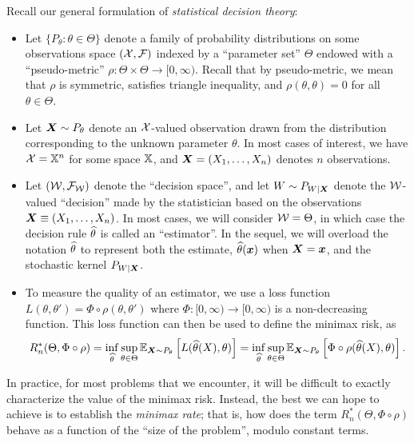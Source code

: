 \documentclass[12pt]{article}
\begin{document}
Recall our general formulation of \emph{statistical decision theory}: 
\begin{itemize}
	\item Let $\{P_\theta: \theta \in \Theta\}$ denote a family of probability distributions on some observations space $({\cal X}, {\cal F})$ indexed by a ``parameter set'' $\Theta$ endowed with a ``pseudo-metric'' $\rho:\Theta \times \Theta \to [0, \infty)$. Recall that by pseudo-metric, we mean that $\rho$ is symmetric, satisfies triangle inequality, and $\rho(\theta, \theta)=0$ for all $\theta \in \Theta$. 

	\item Let ${\boldsymbol X} \sim P_\theta$ denote an ${\cal X}$-valued observation drawn from the distribution corresponding to the unknown parameter $\theta$. In most cases of interest, we have ${\cal X} = \mathbb{X}^n$ for some space $\mathbb{X}$, and ${\boldsymbol X} = (X_1, \ldots, X_n)$ denotes $n$ observations. 

	\item Let $({\cal W}, {\cal F}_{\cal W})$ denote the ``decision space'', and let $W \sim P_{W|{\boldsymbol X}}$  denote the ${\cal W}$-valued ``decision'' made by the statistician based on the observations ${\boldsymbol X} \equiv (X_1, \ldots, X_n)$. In most cases, we will consider ${\cal W} = \Theta$, in which case the decision rule $\widehat{\theta}$ is called an ``estimator''. In the sequel, we will overload the notation $\widehat{\theta}$ to represent both the estimate, $\widehat{\theta}({\boldsymbol x})$ when ${\boldsymbol X}={\boldsymbol x}$, and the stochastic kernel $P_{W|{\boldsymbol X}}$. 

	\item To measure the quality of an estimator, we use a loss function $L(\theta, \theta') = \Phi \circ \rho(\theta, \theta')$ where $\Phi:[0,\infty) \to [0,\infty)$ is a non-decreasing function. This loss function can then be used to define the minimax risk, as 
	\begin{align}
		R_n^*(\Theta, \Phi\circ \rho) =\inf_{\widehat{\theta}} \sup_{\theta \in \Theta} \mathbb{E}_{{\boldsymbol X} \sim P_\theta} \left[ L(\widehat{\theta}(X), \theta) \right] =\inf_{\widehat{\theta}} \sup_{\theta \in \Theta} \mathbb{E}_{{\boldsymbol X} \sim P_\theta} \left[ \Phi \circ \rho(\widehat{\theta}(X), \theta) \right]. 
	\end{align}
\end{itemize}
In practice, for most problems that we encounter, it will be difficult to exactly characterize the value of the minimax risk. Instead, the best we can hope to achieve is to establish the \emph{minimax rate}; that is, how does the term $R_n^*(\Theta, \Phi \circ \rho)$ behave as a function of the ``size of the problem'', modulo constant terms. 
\end{document}
